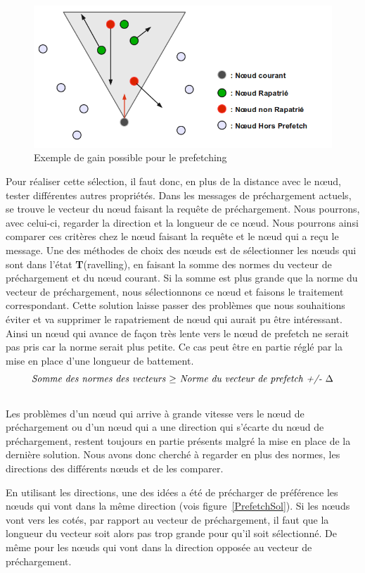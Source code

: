 	\begin{figure}[!h]
        \centering
        \includegraphics[scale=0.45]{./Ressources/Images/prefetchaV1.png}
        \caption{Exemple de gain possible pour le prefetching}
        \label{prefetchav}
        \end{figure}

\par Pour réaliser cette sélection, il faut donc, en plus de la distance avec le nœud, tester différentes autres propriétés. Dans les messages de préchargement actuels, se trouve le vecteur du nœud faisant la requête de préchargement. Nous pourrons, avec celui-ci, regarder la direction et la longueur de ce nœud. Nous pourrons ainsi comparer ces critères chez le nœud faisant la requête et le nœud qui a reçu le message. Une des méthodes de choix des nœuds est de sélectionner les nœuds qui sont dans l'état \textbf{T}(ravelling), en faisant la somme des normes du vecteur de préchargement et du nœud courant. Si la somme est plus grande que la norme du vecteur de préchargement, nous sélectionnons ce nœud et faisons le traitement correspondant. Cette solution laisse passer des problèmes que nous souhaitions éviter et va supprimer le rapatriement de nœud qui aurait pu être intéressant. Ainsi un nœud qui avance de façon très lente vers le nœud de prefetch ne serait pas pris car la norme serait plus petite. Ce cas peut être en partie réglé par la mise en place d'une longueur de battement.
\newline
$$\\\textit{Somme des normes des vecteurs~$\ge$~Norme du vecteur de prefetch +/- $\Delta$}$$
\\Les problèmes d'un nœud qui arrive à grande vitesse vers le nœud de préchargement ou d'un nœud qui a une direction qui s'écarte du nœud de préchargement, restent toujours en partie présents malgré la mise en place de la dernière solution. Nous avons donc cherché à regarder en plus des normes, les directions des différents nœuds et de les comparer.
\par En utilisant les directions, une des idées a été de précharger de préférence les nœuds qui vont dans la même direction (vois figure~\ref{PrefetchSol}). Si les nœuds vont vers les cotés, par rapport au vecteur de préchargement, il faut que la longueur du vecteur soit alors pas trop grande pour qu'il soit sélectionné. De même pour les nœuds qui vont dans la direction opposée au vecteur de préchargement.

